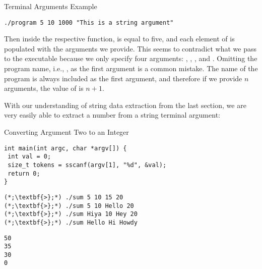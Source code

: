\begin{cl}[main.c]{Terminal Arguments Example}
\begin{lstlisting}[language=MyOutput]
./program 5 10 1000 "This is a string argument"
\end{lstlisting}
\end{cl}

Then inside the respective  function,  is equal to five, and each element of  is populated with the arguments we provide. This seems to contradict what we pass to the executable because we only specify four arguments: , , , and . Omitting the program name, i.e., , as the first argument is a common mistake. The name of the program is always included as the first argument, and therefore if we provide $n$ arguments, the value of  is $n + 1$.

With our understanding of string data extraction from the last section, we are very easily able to extract a number from a string terminal argument:

\begin{cl}[]{Converting Argument Two to an Integer}
\begin{lstlisting}[language=MyC]
int main(int argc, char *argv[]) {
 int val = 0;
 size_t tokens = sscanf(argv[1], "%d", &val);
 return 0;
}
\end{lstlisting}
\end{cl}


\begin{cloast}[]{}
\begin{lstlisting}[language=MyC]
(*;\textbf{>};*) ./sum 5 10 15 20
(*;\textbf{>};*) ./sum 5 10 Hello 20
(*;\textbf{>};*) ./sum Hiya 10 Hey 20
(*;\textbf{>};*) ./sum Hello Hi Howdy
\end{lstlisting}
\tcblower
\begin{lstlisting}[language=MyOutput]
50
35
30
0
\end{lstlisting}
\end{cloast}


